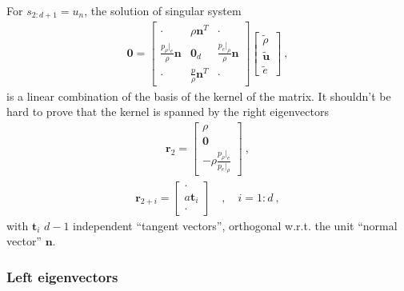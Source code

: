 \documentclass[letterpaper,10pt,english]{jupyterBook}
\begin{document}
\sphinxAtStartPar
For \(s_{2:d+1} = u_n\), the solution of singular system
\begin{equation*}
\begin{split}\mathbf{0} = 
\begin{bmatrix}
   \cdot & \rho \mathbf{n}^T & \cdot \\
  \frac{p_\rho|_e}{\rho} \mathbf{n} & \mathbf{0}_d &  \frac{p_e|_\rho}{\rho} \mathbf{n} \\
  \cdot & \frac{p}{\rho}\mathbf{n}^T & \cdot
\end{bmatrix} \begin{bmatrix} \tilde{\rho} \\ \tilde{\mathbf{u}} \\ \tilde{e} \end{bmatrix} \ ,
\end{split}
\end{equation*}
\sphinxAtStartPar
is a linear combination of the basis of the kernel of the matrix. It shouldn’t be hard to prove that the kernel is spanned by the right eigenvectors
\begin{equation*}
\begin{split}\mathbf{r}_2 = \begin{bmatrix} \rho \\ \mathbf{0} \\ - \rho \frac{p_\rho|_e}{p_e|_\rho}  \end{bmatrix} \ ,\end{split}
\end{equation*}\begin{equation*}
\begin{split}\mathbf{r}_{2+i} = \begin{bmatrix} \cdot \\ a \mathbf{t}_i \\ \cdot \end{bmatrix} \quad , \quad i = 1:d \ ,\end{split}
\end{equation*}
\sphinxAtStartPar
with \(\mathbf{t}_{i}\) \(d-1\) independent “tangent vectors”, orthogonal w.r.t. the unit “normal vector” \(\mathbf{n}\).
\subsubsection*{Left eigenvectors}
\end{document}
